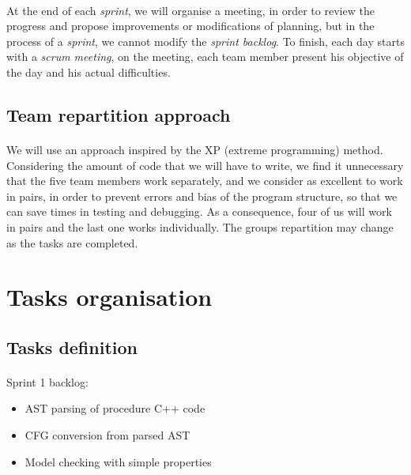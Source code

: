 \documentclass{report}
\begin{document}
\paragraph{}
\hspace{4mm}\textnormal{At the end of each \textit{sprint}, we will organise a meeting, in order to review the progress and propose improvements or modifications of planning,
 but in the process of a \textit{sprint}, we cannot modify the \textit{sprint backlog}. 
To finish, each day starts with a \textit{scrum meeting}, on the meeting, each 
team member present his objective of the day and his actual difficulties.}

\subsection{Team repartition approach}

\paragraph{}
\hspace{4mm}\textnormal{We will use an approach inspired by the XP (extreme programming) method. 
Considering the amount of code that we will have to write, we find it unnecessary that the five team members work separately, 
and we consider as excellent to work in pairs, in order to prevent errors and bias 
of the program structure, so that we can save times in testing and debugging. 
As a consequence, four of us will work in pairs and the last one works individually. The groups repartition
may change as the tasks are completed.}

\section{Tasks organisation}

\subsection{Tasks definition}

\paragraph{}
\hspace{4mm}\textnormal{Sprint 1 backlog:}

\vspace{4mm}
\begin{itemize}
\item AST parsing of procedure C++ code\vspace{1mm}
\item CFG conversion from parsed AST\vspace{1mm}
\item Model checking with simple properties\vspace{1mm}
\end{itemize}
\end{document}
